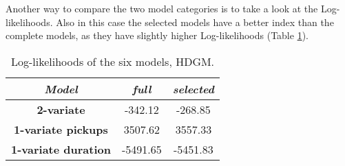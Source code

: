 \noindent
Another way to compare the two model categories is to take a look at the Log-likelihoods. Also in this case the selected models have a better index than the complete models, as they have slightly higher Log-likelihoods (Table \ref{Log-likelihoods HDGM}). 

\begin{table}[h!]
	\centering
	\renewcommand\arraystretch{1.3}
	\begin{tabular}{c|c|c}
		\hline
		\textit{Model} &\textit{full } & \textit{selected} \\ 
		\hline
		\textbf{2-variate } & -342.12  & -268.85    \\ 
		\hline
		\textbf{1-variate pickups } & 3507.62  & 3557.33    \\ 
		\hline
		\textbf{1-variate duration} & -5491.65  & -5451.83   \\ 
		\hline
	\end{tabular}
	\caption[Log-likelihoods of the six models (HDGM)]{Log-likelihoods of the six models, HDGM.}
	\label{Log-likelihoods HDGM}
\end{table}
